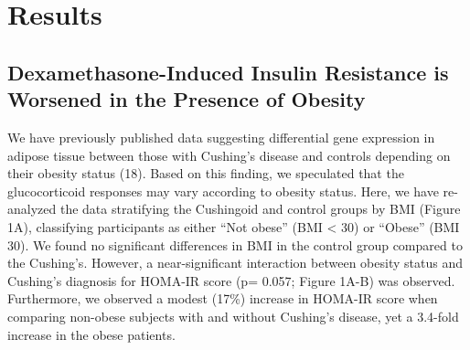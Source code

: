 \documentclass[11pt]{article} %
\begin{document}
\section*{Results}

\subsection*{Dexamethasone-Induced Insulin Resistance is Worsened in the
Presence of Obesity
}\label{dexamethasone-induced-insulin-resistance-is-worsened-in-the-presence-of-obesity}

We have previously published data suggesting differential gene
expression in adipose tissue between those with Cushing's disease and
controls depending on their obesity status (18). Based on this finding,
we speculated that the glucocorticoid responses may vary according to
obesity status. Here, we have re-analyzed the data stratifying the
Cushingoid and control groups by BMI (Figure 1A), classifying
participants as either ``Not obese'' (BMI \textless{} 30) or ``Obese''
(BMI  30). We found no significant differences in BMI in the control
group compared to the Cushing's. However, a near-significant interaction
between obesity status and Cushing's diagnosis for HOMA-IR score (p=
0.057; Figure 1A-B) was observed. Furthermore, we observed a modest
(17\%) increase in HOMA-IR score when comparing non-obese subjects with
and without Cushing's disease, yet a 3.4-fold increase in the obese
patients.
\end{document}
